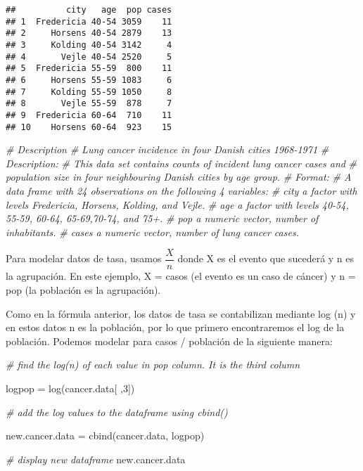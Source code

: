 \documentclass[
]{book}
\newenvironment{Shaded}{\begin{snugshade}}{\end{snugshade}}
\newcommand{\CommentTok}[1]{\textcolor[rgb]{0.56,0.35,0.01}{\textit{#1}}}
\newcommand{\DecValTok}[1]{\textcolor[rgb]{0.00,0.00,0.81}{#1}}
\newcommand{\FunctionTok}[1]{\textcolor[rgb]{0.00,0.00,0.00}{#1}}
\newcommand{\NormalTok}[1]{#1}
\newcommand{\OtherTok}[1]{\textcolor[rgb]{0.56,0.35,0.01}{#1}}
\begin{document}
\begin{verbatim}
##          city   age  pop cases
## 1  Fredericia 40-54 3059    11
## 2     Horsens 40-54 2879    13
## 3     Kolding 40-54 3142     4
## 4       Vejle 40-54 2520     5
## 5  Fredericia 55-59  800    11
## 6     Horsens 55-59 1083     6
## 7     Kolding 55-59 1050     8
## 8       Vejle 55-59  878     7
## 9  Fredericia 60-64  710    11
## 10    Horsens 60-64  923    15
\end{verbatim}

\begin{Shaded}
\begin{Highlighting}[]
\CommentTok{\# Description}
\CommentTok{\# Lung cancer incidence in four Danish cities 1968{-}1971}
\CommentTok{\# Description:}
\CommentTok{\# This data set contains counts of incident lung cancer cases and}
\CommentTok{\# population size in four neighbouring Danish cities by age group.}
\CommentTok{\# Format:}
\CommentTok{\# A data frame with 24 observations on the following 4 variables:}
\CommentTok{\# city a factor with levels Fredericia, Horsens, Kolding, and Vejle.}
\CommentTok{\# age a factor with levels 40{-}54, 55{-}59, 60{-}64, 65{-}69,70{-}74, and 75+.}
\CommentTok{\# pop a numeric vector, number of inhabitants.}
\CommentTok{\# cases a numeric vector, number of lung cancer cases.}
\end{Highlighting}
\end{Shaded}

Para modelar datos de tasa, usamos \(\dfrac{X}{n}\) donde X es el evento que sucederá y n es la agrupación. En este ejemplo, X = casos (el evento es un caso de cáncer) y n = pop (la población es la agrupación).

Como en la fórmula anterior, los datos de tasa se contabilizan mediante log (n) y en estos datos n es la población, por lo que primero encontraremos el log de la población. Podemos modelar para casos / población de la siguiente manera:

\begin{Shaded}
\begin{Highlighting}[]
\CommentTok{\# find the log(n) of each value in \textquotesingle{}pop\textquotesingle{} column. It is the third column}

\NormalTok{logpop }\OtherTok{=} \FunctionTok{log}\NormalTok{(cancer.data[ ,}\DecValTok{3}\NormalTok{])}

\CommentTok{\# add the log values to the dataframe using \textquotesingle{}cbind()\textquotesingle{}}

\NormalTok{new.cancer.data }\OtherTok{=} \FunctionTok{cbind}\NormalTok{(cancer.data, logpop)}

\CommentTok{\# display new dataframe}
\NormalTok{new.cancer.data}
\end{Highlighting}
\end{Shaded}
\end{document}
